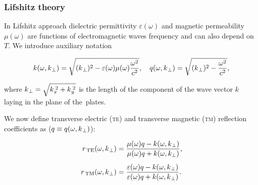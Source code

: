 \documentclass[10pt,t]{beamer}
\begin{document}
\begin{frame}
  \frametitle{Lifshitz theory}


  In Lifshitz approach dielectric permittivity $\varepsilon( \omega )$ and magnetic
  permeability $\mu( \omega )$ are functions of electromagnetic waves frequency
  and can also depend on~$T$. We introduce auxiliary notation

  \vspace{-1em}



  \begin{equation}
    \label{eq:First-theoretical-works-02}
    k( \omega, k_{ \hspace{0.05em} \bot } ) =
    \sqrt{ ( k_{ \hspace{0.05em} \bot } )^{ 2 } -
      \varepsilon( \omega ) \mu( \omega ) \frac{ \omega^{ 2 } }{ c^{ 2 } } }, \quad
    q( \omega, k_{ \hspace{0.05em} \bot } ) =
    \sqrt{ ( k_{ \hspace{0.05em} \bot } )^{ 2 } -
      \frac{ \omega^{ 2 } }{ c^{ 2 } } },
  \end{equation}

  \vspace{-1em}



  where
  $k_{ \hspace{0.05em} \bot } = \sqrt{ k_{ \hspace{0.05em} x }^{ \hspace{0.22em} 2 } +
    k_{ \hspace{0.05em} y }^{ \hspace{0.22em} 2 } }$ is the length of the component of
  the wave vector $k$ laying in the plane of the~plates.

  We now define transverse electric (\textsc{te}) and transverse magnetic
  (\textsc{tm}) reflection coefficients as
  ($q \equiv q( \omega, k_{ \hspace{0.05em} \bot } )$):

  \vspace{-1.5em}



  \begin{subequations}

    \begin{align}
      \label{eq:First-theoretical-works-03-A}
      r_{ \, \text{TE} }( \omega, k_{ \hspace{0.05em} \bot } )
      &=
        \frac{ \mu( \omega ) q - k( \omega, k_{ \hspace{0.05em} \bot } ) }
        { \mu( \omega ) q + k( \omega, k_{ \bot } ) }, \\[0.5em]
      \label{eq:First-theoretical-works-03-B}
      r_{ \, \text{TM} }( \omega, k_{ \hspace{0.05em} \bot } )
      &=
        \frac{ \varepsilon( \omega ) q - k( \omega, k_{ \hspace{0.05em} \bot } ) }
        { \varepsilon( \omega ) q + k( \omega, k_{ \hspace{0.05em} \bot } ) }.
    \end{align}

  \end{subequations}

\end{frame}
\end{document}
